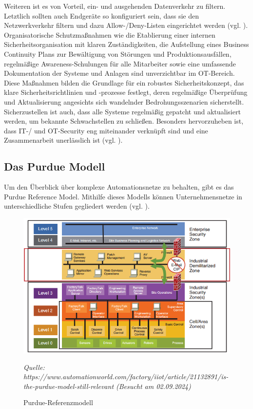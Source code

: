 Weiteren ist es von Vorteil, ein- und ausgehenden Datenverkehr zu filtern. Letztlich sollten auch Endgeräte so konfiguriert sein, dass sie den Netzwerkverkehr filtern und dazu Allow-/Deny-Listen eingerichtet werden (vgl. \cite{mitre}). 
\noindent Organisatorische Schutzmaßnahmen wie die Etablierung einer internen Sicherheitsorganisation mit klaren Zuständigkeiten, die Aufstellung eines Business Continuity Plans zur Bewältigung von Störungen und Produktionsausfällen, regelmäßige Awareness-Schulungen für alle Mitarbeiter sowie eine umfassende Dokumentation der Systeme und Anlagen sind unverzichtbar im OT-Bereich. Diese Maßnahmen bilden die Grundlage für ein robustes Sicherheitskonzept, das klare Sicherheitsrichtlinien und -prozesse festlegt, deren regelmäßige Überprüfung und Aktualisierung angesichts sich wandelnder Bedrohungsszenarien sicherstellt. Sicherzustellen ist auch, dass alle Systeme regelmäßig gepatcht und aktualisiert werden, um bekannte Schwachstellen zu schließen. Besonders hervorzuheben ist, dass IT-/ und OT-Security eng miteinander verknüpft sind und eine Zusammenarbeit unerlässlich ist (vgl. \cite{orga}). 

\subsection{Das Purdue Modell}

Um den Überblick über komplexe Automationsnetze zu behalten, gibt es das Purdue Reference Model. Mithilfe dieses Modells können Unternehmensnetze in unterschiedliche Stufen gegliedert werden (vgl. \cite{sichereIndustrie2}).
\begin{figure}[H]
    \centering
    \includegraphics[width=\textwidth]{images/Purdue_Modell.png} %
    \caption{Purdue-Referenzmodell}
    \label{fig:purdue_modell}
    \vspace{0.5em} %
    \centering
    \textit{Quelle: https://www.automationworld.com/factory/iiot/article/21132891/is-the-purdue-model-still-relevant (Besucht am 02.09.2024)} %
\end{figure}

